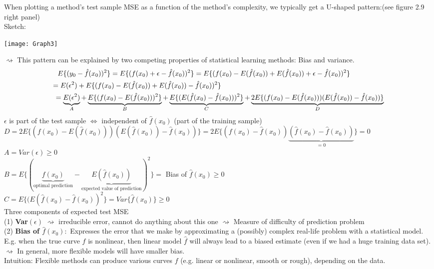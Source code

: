 \documentclass[11pt,a4paper,numbers=endperiod]{scrartcl}
\begin{document}
When plotting a method's test sample MSE as a function of the method's complexity, we typically get a U-shaped pattern:(see figure 2.9 right panel)\\
Sketch: 
\begin{center}
	\texttt{[image: Graph3]}
\end{center}

$\rightsquigarrow$ This pattern can be explained by two competing properties of statistical learning methods: Bias and variance.
\begin{align*}
	E \{(y_0 - \hat{f}(x_0))^2\} = E\{(f(x_0) + \epsilon - \hat{f}(x_0))^2\} = E \{(f(x_0) - E(\hat{f}(x_0)) + E(\hat{f}(x_0)) + \epsilon - \hat{f}(x_0))^2\} \hspace*{17mm}\\ 
	= E(\epsilon^2) + E\{(f(x_0) - E(\hat{f}(x_0)) + E(\hat{f}(x_0)) - \hat{f}(x_0))^2\} \hspace*{82mm}\\
	 = \underbrace{E(\epsilon^2)}_{A} + \underbrace{E\{(f(x_0) - E(\hat{f}(x_0)))^2\}}_{B} + \underbrace{E\{(E(\hat{f}(x_0) - \hat{f}(x_0)))^2\}}_{C}  + \underbrace{2E\{(f(x_0) - E(\hat{f}(x_0))) (E(\hat{f}(x_0)) - \hat{f}(x_0))\}}_{D}
\end{align*}
$\epsilon$ is part of the test sample $\Leftrightarrow$ independent of $\hat{f}(x_0)$ (part of the training sample)\\

$D = 2E\{(f(x_0) - E(\hat{f}(x_0))) (E(\hat{f}(x_0)) - \hat{f}(x_0))\} = 2E\{(f(x_0) - \hat{f}(x_0)) \underbrace{(\hat{f}(x_0) - \hat{f}(x_0))}_{=0}\} = 0$\\
$A = Var(\epsilon) \geq 0$\\
$B = E\{(\underbrace{f(x_0)}_{\text{optimal prediction}} - \underbrace{E(\hat{f}(x_0))}_{\text{expected value of prediction}})^2\} =$ Bias of $\hat{f}(x_0) \geq 0$\\

$C = E\{(E(\hat{f}(x_0) - \hat{f}(x_0))^2\} = Var \{\hat{f}(x_0)\} \geq 0$\\

Three components of expected test MSE\\
(1) \textbf{Var$(\epsilon)$} $\rightsquigarrow$ irreducible error, cannot do anything about this one $\rightsquigarrow$ Measure of difficulty of prediction problem\\
(2) \textbf{Bias of $\hat{f}(x_0):$} Expresses the error that we make by approximating a (possibly) complex real-life problem with a statistical model. E.g. when the true curve $f$ is nonlinear, then linear model $\hat{f}$ will always lead to a biased estimate (even if we had a huge training data set).\\
$\rightsquigarrow$ In general, more flexible models will have smaller bias.\\
Intuition: Flexible methods can produce various curves $f$ (e.g. linear or nonlinear, smooth or rough), depending on the data. 
\end{document}
